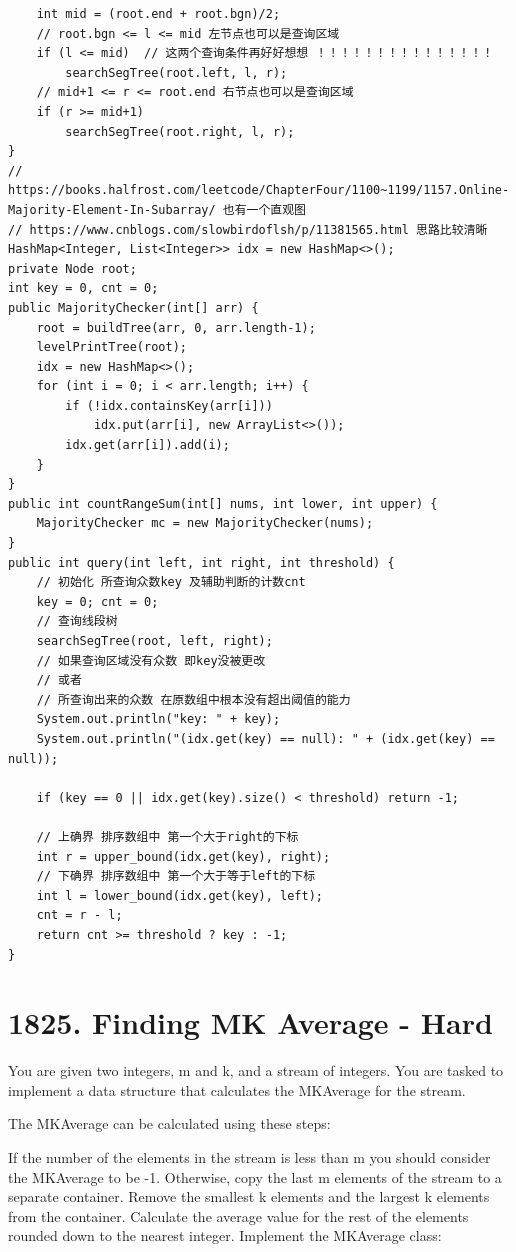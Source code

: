 \documentclass[9pt, b5paaper]{book}
\begin{document}
\begin{verbatim}
    int mid = (root.end + root.bgn)/2;
    // root.bgn <= l <= mid 左节点也可以是查询区域
    if (l <= mid)  // 这两个查询条件再好好想想 ！！！！！！！！！！！！！！！
        searchSegTree(root.left, l, r);
    // mid+1 <= r <= root.end 右节点也可以是查询区域
    if (r >= mid+1) 
        searchSegTree(root.right, l, r);
}
// https://books.halfrost.com/leetcode/ChapterFour/1100~1199/1157.Online-Majority-Element-In-Subarray/ 也有一个直观图
// https://www.cnblogs.com/slowbirdoflsh/p/11381565.html 思路比较清晰
HashMap<Integer, List<Integer>> idx = new HashMap<>();
private Node root;
int key = 0, cnt = 0;
public MajorityChecker(int[] arr) {
    root = buildTree(arr, 0, arr.length-1);
    levelPrintTree(root);
    idx = new HashMap<>();
    for (int i = 0; i < arr.length; i++) {
        if (!idx.containsKey(arr[i]))
            idx.put(arr[i], new ArrayList<>());
        idx.get(arr[i]).add(i);
    }
}
public int countRangeSum(int[] nums, int lower, int upper) {
    MajorityChecker mc = new MajorityChecker(nums);
}
public int query(int left, int right, int threshold) {
    // 初始化 所查询众数key 及辅助判断的计数cnt
    key = 0; cnt = 0;
    // 查询线段树
    searchSegTree(root, left, right);
    // 如果查询区域没有众数 即key没被更改
    // 或者
    // 所查询出来的众数 在原数组中根本没有超出阈值的能力
    System.out.println("key: " + key);
    System.out.println("(idx.get(key) == null): " + (idx.get(key) == null));

    if (key == 0 || idx.get(key).size() < threshold) return -1;

    // 上确界 排序数组中 第一个大于right的下标
    int r = upper_bound(idx.get(key), right);
    // 下确界 排序数组中 第一个大于等于left的下标
    int l = lower_bound(idx.get(key), left);
    cnt = r - l;
    return cnt >= threshold ? key : -1;
}
\end{verbatim}

\section{1825. Finding MK Average - Hard}
\label{sec-7-2}
You are given two integers, m and k, and a stream of integers. You are tasked to implement a data structure that calculates the MKAverage for the stream.

The MKAverage can be calculated using these steps:

If the number of the elements in the stream is less than m you should consider the MKAverage to be -1. Otherwise, copy the last m elements of the stream to a separate container.
Remove the smallest k elements and the largest k elements from the container.
Calculate the average value for the rest of the elements rounded down to the nearest integer.
Implement the MKAverage class:
\end{document}
